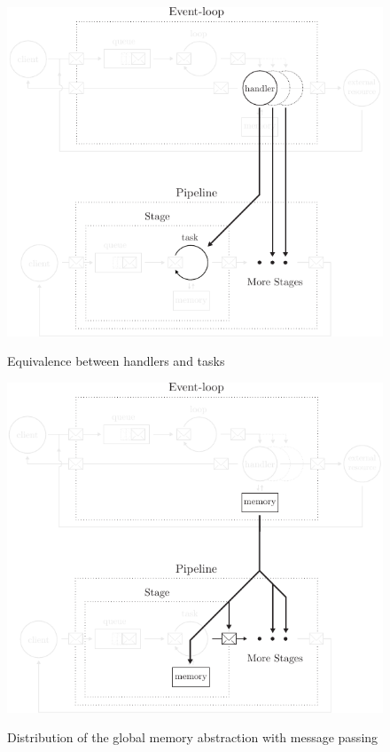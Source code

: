 \begin{figure}[h!]
  \centering
  \begin{minipage}{0.49\textwidth}
    \centering
    \includegraphics[width=\linewidth]{../resources/run-equivalence.pdf}
    \label{fig:run-equivalence}
    \caption{Equivalence between handlers and tasks}
  \end{minipage}
  \vrule
  \hfill
  \begin{minipage}{0.49\textwidth}
    \centering
    \includegraphics[width=\linewidth]{../resources/mem-equivalence.pdf}
    \label{fig:mem-equivalence}
    \caption{Distribution of the global memory abstraction with message passing}
  \end{minipage}
\end{figure}



